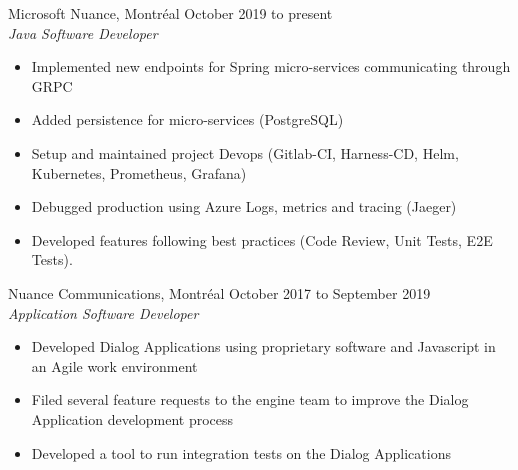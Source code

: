 \documentclass{res}
\newcommand{\inEnglish}[1]{#1}
\begin{document}
\begin{resume}
%
%	

\inEnglish{
	Microsoft Nuance, Montréal
	\hfill October 2019 to present \\
	{\sl Java Software Developer}
	\vspace{0.05in}

	\begin{itemize} \itemsep -2pt
		\item Implemented new endpoints for Spring micro-services communicating through GRPC
		\item Added persistence for micro-services (PostgreSQL)
		\item Setup and maintained project Devops (Gitlab-CI, Harness-CD, Helm, Kubernetes, Prometheus, Grafana)
		\item Debugged production using Azure Logs, metrics and tracing (Jaeger)
	           \item Developed features following best practices (Code Review, Unit Tests, E2E Tests).
	\end{itemize}

	Nuance Communications, Montréal
	\hfill October 2017 to September 2019 \\
	{\sl Application Software Developer}
	\vspace{0.05in}

	\begin{itemize} \itemsep -2pt
		\item Developed Dialog Applications using proprietary software and Javascript in an Agile work environment
		\item Filed several feature requests to the engine team to improve the Dialog Application development process
		\item Developed a tool to run integration tests on the Dialog Applications
	\end{itemize}

}
\end{resume}
\end{document}
